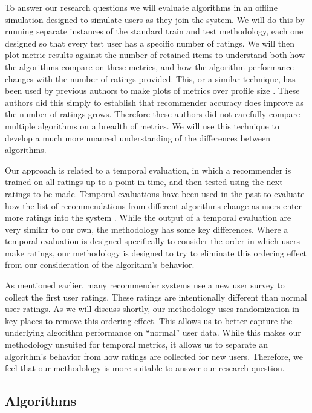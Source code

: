 \documentclass[letterpaper]{sig-alternate}
\begin{document}
  To answer our research questions we will evaluate algorithms in an offline simulation designed to simulate users as they join the system.
  We will do this by running separate instances of the standard train and test methodology, each one designed so that every test user has a specific  number of ratings.
  We will then plot metric results against the number of retained items to understand both how the algorithms compare on these metrics, and how the algorithm performance changes with the number of ratings provided.
  This, or a similar technique, has been used by previous authors to make plots of metrics over profile size \cite{DrennerInitialExperiance, TenIsEnough, AdaptiveBootstrap}.
  These authors did this simply to establish that recommender accuracy does improve as the number of ratings grows.
  Therefore these authors did not carefully compare multiple algorithms on a breadth of metrics.
  We will use this technique to develop a much more nuanced understanding of the differences between algorithms.

  Our approach is related to a temporal evaluation, in which a recommender is trained on all ratings up to a point in time, and then tested using the next ratings to be made.
  Temporal evaluations have been used in the past to evaluate how the list of recommendations from different algorithms change as users enter more ratings into the system \cite{LathiaTemporal}.
  While the output of a temporal evaluation are very similar to our own, the methodology has some key differences.
  Where a temporal evaluation is designed specifically to consider the order in which users make ratings, our methodology is designed to try to eliminate this ordering effect from our consideration of the algorithm's behavior.

  As mentioned earlier, many recommender systems use a new user survey to collect the first user ratings.
  These ratings are intentionally different than normal user ratings.
  As we will discuss shortly, our methodology uses randomization in key places to remove this ordering effect.
  This allows us to better capture the underlying algorithm performance on ``normal'' user data.
  While this makes our methodology unsuited for temporal metrics, it allows us to separate an algorithm's behavior from how ratings are collected for new users.
  Therefore, we feel that our methodology is more suitable to answer our research question.

  \subsection*{Algorithms}
\end{document}
